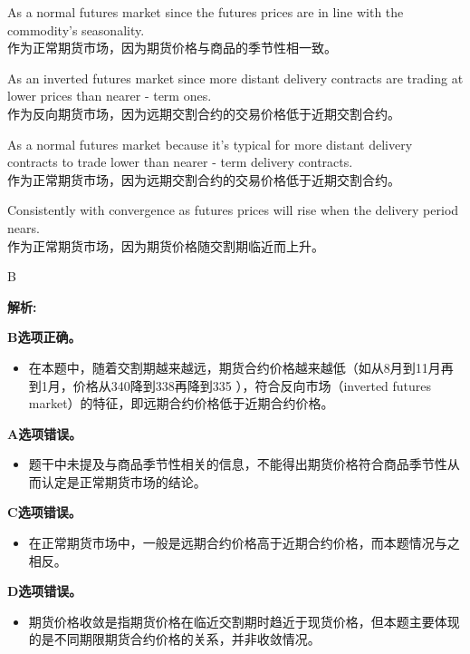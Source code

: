 \documentclass{article}
\newenvironment{explanation}
{\textbf{解析:}\par}
{\par}
\begin{document}
        \begin{choices}
            \item As a normal futures market since the futures prices are in line with the commodity's seasonality.\\
            作为正常期货市场，因为期货价格与商品的季节性相一致。
            \item As an inverted futures market since more distant delivery contracts are trading at lower prices than nearer - term ones.\\
            作为反向期货市场，因为远期交割合约的交易价格低于近期交割合约。
            \item As a normal futures market because it's typical for more distant delivery contracts to trade lower than nearer - term delivery contracts.\\
            作为正常期货市场，因为远期交割合约的交易价格低于近期交割合约。
            \item Consistently with convergence as futures prices will rise when the delivery period nears.\\
            作为正常期货市场，因为期货价格随交割期临近而上升。
        \end{choices}
        
        \begin{correctanswer}
            B
        \end{correctanswer}
        
        \begin{explanation}
        \textbf{B选项正确。}
        \begin{itemize}
        \item 在本题中，随着交割期越来越远，期货合约价格越来越低（如从8月到11月再到1月，价格从340降到338再降到335 ），符合反向市场（inverted futures market）的特征，即远期合约价格低于近期合约价格。
        \end{itemize}
        \textbf{A选项错误。}
        \begin{itemize}
        \item 题干中未提及与商品季节性相关的信息，不能得出期货价格符合商品季节性从而认定是正常期货市场的结论。
        \end{itemize}
        \textbf{C选项错误。}
        \begin{itemize}
        \item 在正常期货市场中，一般是远期合约价格高于近期合约价格，而本题情况与之相反。
        \end{itemize}
        \textbf{D选项错误。}
        \begin{itemize}
        \item 期货价格收敛是指期货价格在临近交割期时趋近于现货价格，但本题主要体现的是不同期限期货合约价格的关系，并非收敛情况。
        \end{itemize}
        \end{explanation}
        
\end{document}
